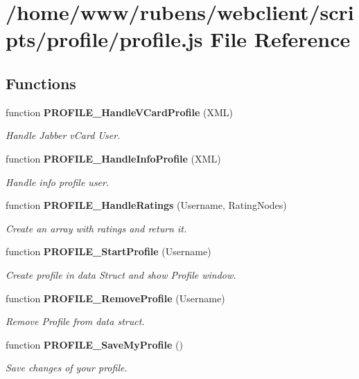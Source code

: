 \section{/home/www/rubens/webclient/scripts/profile/profile.js File Reference}
\label{profile_2profile_8js}
\subsection*{Functions}
\begin{CompactItemize}
\item 
function {\bf PROFILE\_\-HandleVCardProfile} (XML)
\begin{CompactList}\small\item\em Handle Jabber vCard User. \item\end{CompactList}\item 
function {\bf PROFILE\_\-HandleInfoProfile} (XML)
\begin{CompactList}\small\item\em Handle info profile user. \item\end{CompactList}\item 
function {\bf PROFILE\_\-HandleRatings} (Username, RatingNodes)
\begin{CompactList}\small\item\em Create an array with ratings and return it. \item\end{CompactList}\item 
function {\bf PROFILE\_\-StartProfile} (Username)
\begin{CompactList}\small\item\em Create profile in data Struct and show Profile window. \item\end{CompactList}\item 
function {\bf PROFILE\_\-RemoveProfile} (Username)
\begin{CompactList}\small\item\em Remove Profile from data struct. \item\end{CompactList}\item 
function {\bf PROFILE\_\-SaveMyProfile} ()
\begin{CompactList}\small\item\em Save changes of your profile. \item\end{CompactList}\item 

\end{CompactItemize}
